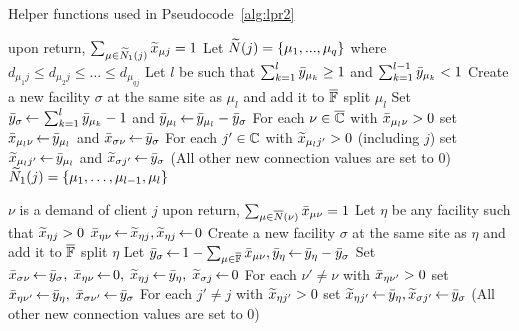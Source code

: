 \documentclass[11pt]{article}
\begin{document}
\begin{algorithm}[ht]
  \caption{Helper functions used in Pseudocode~\ref{alg:lpr2}}
  \label{alg:helper}
  \begin{algorithmic}[1]
						\Comment upon return, $\sum_{\mu\in{\widetilde N}_1(j)} {\widetilde x}_{\mu j} = 1$
    \State Let ${\widetilde N}(j) = \{\mu_1,...,\mu_{q}\}$ where $d_{\mu_1 j} \leq d_{\mu_2 j} \leq \ldots \leq d_{\mu_{q j}}$
    \State Let $l$ be such that $\sum_{k=1}^{l} {\bar y}_{\mu_k} \geq 1$ and $\sum_{k=1}^{l -1} {\bar y}_{\mu_{k}} < 1$
    \State Create a new facility $\sigma$ at the same site as $\mu_l$ and add it to $\overline{\mathbb{F}}$
			\Comment split $\mu_l$
    \State Set ${\bar y}_{\sigma}{\,\leftarrow\,} \sum_{k=1}^{l} {\bar y}_{\mu_{k}}-1$
					and ${\bar y}_{\mu_l} {\,\leftarrow\,} {\bar y}_{\mu_l} - {\bar y}_{\sigma}$
    \State For each $\nu\in\overline{\mathbb{C}}$ with ${\bar x}_{\mu_{l}\nu}>0$
 			set ${\bar x}_{\mu_{l}\nu} {\,\leftarrow\,} {\bar y}_{\mu_l}$ and ${\bar x}_{\sigma \nu} {\,\leftarrow\,} {\bar y}_{\sigma}$
    \State For each $j'\in\mathbb{C}$ with ${\widetilde x}_{\mu_{l} j'}>0$ (including $j$)
			set ${\widetilde x}_{\mu_l j'} {\,\leftarrow\,} {\bar y}_{\mu_l}$ and ${\widetilde x}_{\sigma j'} {\,\leftarrow\,} {\bar y}_\sigma$
	\State (All other new connection values are set to $0$)
    \State \Return ${\widetilde N}_1(j) = \{\mu_{1},\ldots,\mu_{l-1}, \mu_{l}\}$    				
    \EndFunction

    					\Comment $\nu$ is a demand of client $j$
    					\Comment upon return, $\sum_{\mu\in{\overline{N}}(\nu)} {\bar x}_{\mu\nu} = 1$
    \State Let $\eta$ be any facility such that ${\widetilde x}_{\eta j} > 0$
    \State ${\bar x}_{\eta\nu} {\,\leftarrow\,} {\widetilde x}_{\eta j}, {\widetilde x}_{\eta j} {\,\leftarrow\,} 0$
    \Else
    \State Create a new facility $\sigma$ at the same site as $\eta$ and add it to $\overline{\mathbb{F}}$
    					\Comment split $\eta$
    \State Let ${\bar y}_\sigma {\,\leftarrow\,} 1-\sum_{\mu\in \overline{\mathbb{F}}} {\bar x}_{\mu\nu}, {\bar y}_{\eta} {\,\leftarrow\,} {\bar y}_{\eta} - {\bar y}_{\sigma}$
    \State Set ${\bar x}_{\sigma\nu}{\,\leftarrow\,} {\bar y}_{\sigma},\; {\bar x}_{\eta \nu} {\,\leftarrow\,}  0,\; {\widetilde x}_{\eta j} {\,\leftarrow\,} {\bar y}_{\eta}, \; {\widetilde x}_{\sigma j} {\,\leftarrow\,} 0$
    \State For each $\nu' \neq \nu$ with ${\bar x}_{\eta \nu'}>0$ set ${\bar x}_{\eta \nu'} {\,\leftarrow\,} {\bar y}_{\eta},\; {\bar x}_{\sigma \nu'} {\,\leftarrow\,} {\bar y}_{\sigma}$
    \State For each $j' \neq j$ with ${\widetilde x}_{\eta j'}>0$ set ${\widetilde x}_{\eta j'} {\,\leftarrow\,} {\bar y}_{\eta}, {\widetilde x}_{\sigma j'} {\,\leftarrow\,} {\bar y}_{\sigma}$
	\State  (All other new connection values are set to $0$)
    \EndIf
    \EndWhile
    \EndFunction
  \end{algorithmic}
\end{algorithm}
\end{document}
